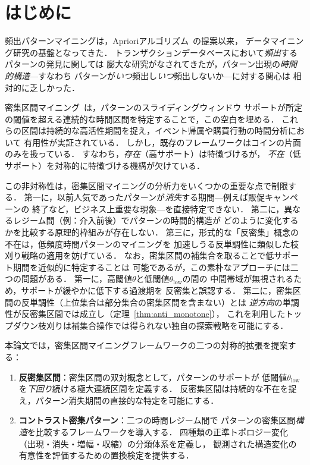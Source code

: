 \section{はじめに}\label{sec:intro}

頻出パターンマイニングは，Aprioriアルゴリズム~\cite{agrawal1994apriori}の提案以来，
データマイニング研究の基盤となってきた．
トランザクションデータベースにおいて\emph{頻出}するパターンの発見に関しては
膨大な研究がなされてきたが，パターン出現の\emph{時間的構造}---すなわち
パターンが\emph{いつ}頻出し\emph{いつ}頻出しないか---に対する関心は
相対的に乏しかった．

密集区間マイニング~\cite{dong2012contrast}は，パターンのスライディングウィンドウ
サポートが所定の閾値を超える連続的な時間区間を特定することで，この空白を埋める．
これらの区間は持続的な高活性期間を捉え，イベント帰属や購買行動の時間分析において
有用性が実証されている．
しかし，既存のフレームワークはコインの片面のみを扱っている．
すなわち，\emph{存在}（高サポート）は特徴づけるが，
\emph{不在}（低サポート）を対称的に特徴づける機構が欠けている．

この非対称性は，密集区間マイニングの分析力をいくつかの重要な点で制限する．
第一に，以前人気であったパターンが\emph{消失}する期間---例えば販促キャンペーンの
終了など，ビジネス上重要な現象---を直接特定できない．
第二に，異なるレジーム間（例：介入前後）でパターンの時間的構造が
どのように変化するかを比較する原理的枠組みが存在しない．
第三に，形式的な「反密集」概念の不在は，低頻度時間パターンのマイニングを
加速しうる反単調性に類似した枝刈り戦略の適用を妨げている．
なお，密集区間の補集合を取ることで低サポート期間を近似的に特定することは
可能であるが，この素朴なアプローチには二つの問題がある．
第一に，高閾値$\theta$と低閾値$\theta_{\text{low}}$の間の
中間帯域が無視されるため，サポートが緩やかに低下する過渡期を
反密集と誤認する．
第二に，密集区間の反単調性（上位集合は部分集合の密集区間を含まない）とは
\emph{逆方向}の単調性が反密集区間では成立し（定理~\ref{thm:anti_monotone}），
これを利用したトップダウン枝刈りは補集合操作では得られない独自の探索戦略を可能にする．

本論文では，密集区間マイニングフレームワークの二つの対称的拡張を提案する：

\begin{enumerate}
\item \textbf{反密集区間}：密集区間の双対概念として，パターンのサポートが
低閾値$\theta_{\text{low}}$を\emph{下回り}続ける極大連続区間を定義する．
反密集区間は持続的な不在を捉え，パターン消失期間の直接的な特定を可能にする．

\item \textbf{コントラスト密集パターン}：二つの時間レジーム間で
パターンの密集区間\emph{構造}を比較するフレームワークを導入する．
四種類の正準トポロジー変化（出現・消失・増幅・収縮）の分類体系を定義し，
観測された構造変化の有意性を評価するための置換検定を提供する．
\end{enumerate}

